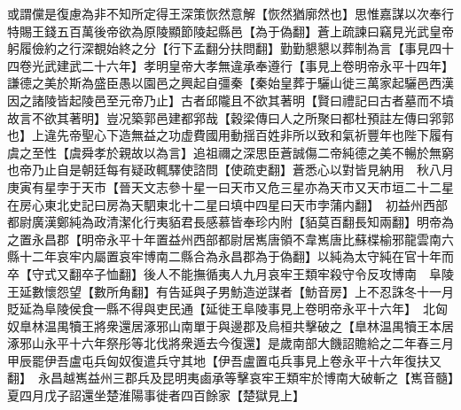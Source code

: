 或謂儻是復慮為非不知所定得王深策恢然意解【恢然猶廓然也】思惟嘉謀以次奉行特賜王錢五百萬後帝欲為原陵顯節陵起縣邑【為于偽翻】蒼上疏諫曰竊見光武皇帝躬履儉約之行深覩始終之分【行下孟翻分扶問翻】勤勤懇懇以葬制為言【事見四十四卷光武建武二十六年】孝明皇帝大孝無違承奉遵行【事見上卷明帝永平十四年】謙德之美於斯為盛臣愚以園邑之興起自彊秦【秦始皇葬于驪山徙三萬家起驪邑西漢因之諸陵皆起陵邑至元帝乃止】古者邱隴且不欲其著明【賢曰禮記曰古者墓而不墳故言不欲其著明】豈况築郭邑建都郛哉【穀梁傳曰人之所聚曰都杜預註左傳曰郛郭也】上違先帝聖心下造無益之功虚費國用動揺百姓非所以致和氣祈豐年也陛下履有虞之至性【虞舜孝於親故以為言】追祖禰之深思臣蒼誠傷二帝純德之美不暢於無窮也帝乃止自是朝廷每有疑政輒驛使諮問【使疏吏翻】蒼悉心以對皆見納用　秋八月庚寅有星孛于天市【晉天文志參十星一曰天市又危三星亦為天市又天市垣二十二星在房心東北史記曰房為天駟東北十二星曰填中四星曰天市孛蒲内翻】　初益州西部都尉廣漢鄭純為政清潔化行夷貊君長感慕皆奉珍内附【貊莫百翻長知兩翻】明帝為之置永昌郡【明帝永平十年置益州西部都尉居嶲唐領不韋嶲唐比蘇楪榆邪龍雲南六縣十二年哀牢内屬置哀牢博南二縣合為永昌郡為于偽翻】以純為太守純在官十年而卒【守式又翻卒子恤翻】後人不能撫循夷人九月哀牢王類牢殺守令反攻博南　阜陵王延數懷怨望【數所角翻】有告延與子男魴造逆謀者【魴音房】上不忍誅冬十一月貶延為阜陵侯食一縣不得與吏民通【延徙王阜陵事見上卷明帝永平十六年】　北匈奴臯林温禺犢王將衆還居涿邪山南單于與邊郡及烏桓共擊破之【臯林温禺犢王本居涿邪山永平十六年祭彤等北伐將衆遁去今復還】是歲南部大饑詔贍給之二年春三月甲辰罷伊吾盧屯兵匈奴復遣兵守其地【伊吾盧置屯兵事見上卷永平十六年復扶又翻】　永昌越嶲益州三郡兵及昆明夷鹵承等擊哀牢王類牢於博南大破斬之【嶲音髓】夏四月戊子詔還坐楚淮陽事徙者四百餘家【楚獄見上】

